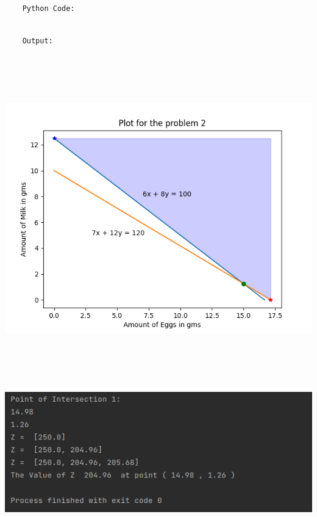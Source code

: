 \documentclass[12pt, letterpaper, twoside]{book}
\begin{document}
\begin{lstlisting}

	Python Code:

\end{lstlisting}

\pagebreak
\begin{lstlisting}

	Output:

\end{lstlisting}
\begin{center}
\includegraphics[height=400pt]{Plot2}
\end{center}
\begin{flushleft}
\includegraphics[width=\paperwidth]{Output2}
\end{flushleft}
\end{document}

